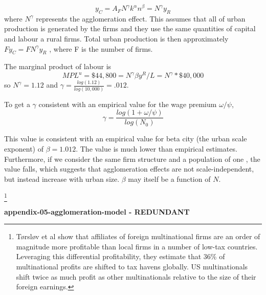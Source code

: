 \[y_C=A_F N^\gamma k^\alpha n^\beta = N^\gamma y_R\]
where $N^\gamma$ represents the agglomeration effect. This assumes that all of urban production is generated by the firms and they use the same quantities of capital and labour a rural firms. Total urban production is then approximately $Fy_C=FN^\gamma y_R $ , where F is the number of firms.

The marginal product of labour is 
\[MPL^u=\$44,800=N^\gamma \beta y^R/L=N^\gamma *\$40,000\]
so $N^\gamma= 1.12$ and $\gamma = \frac{log(1.12)}{log(10,000)} =.012$. 

{\color{red}
To get a  $\gamma$  consistent with an empirical  value for  the wage premium  $\omega / \psi$, 
\begin{equation}
\gamma= \frac{log(1+\omega/\psi)}{log(N_0)}\label{eqn:gamma-define}
\end{equation}
}

This value is consistent with an empirical  value for  beta city (the urban scale exponent) of $\beta =  1.012$. The value is much lower than empirical estimates. Furthermore, if we consider the same firm structure and a population of one , the value falls, which suggests that agglomeration effects are not scale-independent, but instead increase with urban size. $\beta$ may itself be a function of $N$.




\footnote{Tørsløv et al \cite{torslovMissingProfitsNations2023} show that affiliates of foreign multinational firms are an order of magnitude more profitable than local firms in a number of low-tax countries. Leveraging this differential profitability, they estimate that 36\% of multinational profits are shifted to tax havens globally. US multinationals shift twice as much profit as other multinationals relative to the size of their foreign earnings.}


\textbf{appendix-05-agglomeration-model - REDUNDANT} %



